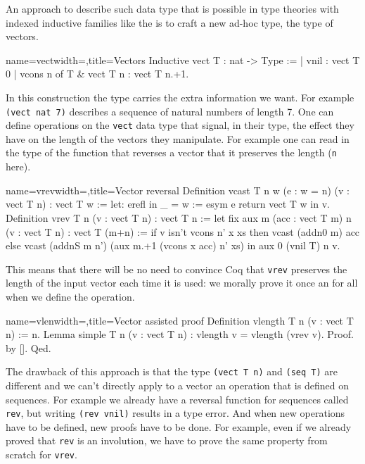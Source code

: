 An approach to describe such data type that is possible in type
theories with indexed inductive families like the \mcbCIC{} is to
craft a new ad-hoc type, the type of vectors.

\begin{coq}{name=vect}{width=\textwidth,title=Vectors}
Inductive vect T : nat -> Type :=
| vnil : vect T 0
| vcons n of T & vect T n : vect T n.+1.
\end{coq}

In this construction the type carries the extra information we want.
For example \lstinline/(vect nat 7)/ describes a sequence of natural
numbers of length 7.
One can define operations on the \lstinline/vect/ data type that
signal, in their type, the effect they have on the length of the
vectors they manipulate.  For example one can read in the type of the
function that reverses a vector that it preserves the length
(\lstinline/n/ here).

\begin{coq}{name=vrev}{width=\textwidth,title=Vector reversal}
Definition vcast {T n w} (e : w = n) (v : vect T n) : vect T w :=
  let: erefl in _ = w := esym e return vect T w in v.
  Definition vrev {T n} (v : vect T n) : vect T n :=
  let fix aux m (acc : vect T m) n (v : vect T n) : vect T (m+n) :=
    if v isn't vcons n' x xs then vcast (addn0 m) acc
    else vcast (addnS m n') (aux m.+1 (vcons x acc) n' xs) in
  aux 0 (vnil T) n v.
\end{coq}

This means that there will be no need to convince Coq that
\lstinline/vrev/ preserves the length of the input vector
each time it is used: we morally prove it once an for all
when we define the operation.

\begin{coq}{name=vlen}{width=\textwidth,title=Vector assisted proof}
Definition vlength {T n} (v : vect T n) := n.
Lemma simple T n (v : vect T n) : vlength v = vlength (vrev v).
Proof. by []. Qed.
\end{coq}

The drawback of this approach is that the type \lstinline/(vect T n)/
and \lstinline/(seq T)/ are different and we can't directly apply to a
vector an operation that is defined on sequences.  For example we
already have a reversal function for sequences called \lstinline/rev/,
but writing \lstinline/(rev vnil)/ results in a type error.  And when
new operations have to be defined, new proofs have to be done. For
example, even if we already proved that \lstinline/rev/ is an
involution, we have to prove the same property from scratch for
\lstinline/vrev/.

